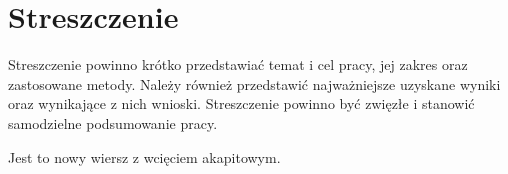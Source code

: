 \chapter*{Streszczenie}

Streszczenie powinno krótko przedstawiać temat i cel pracy, jej zakres
oraz zastosowane metody. Należy również przedstawić najważniejsze uzyskane
wyniki oraz wynikające z nich wnioski. Streszczenie powinno być zwięzłe
i stanowić samodzielne podsumowanie pracy.

\newline \indent Jest to nowy wiersz z wcięciem akapitowym.